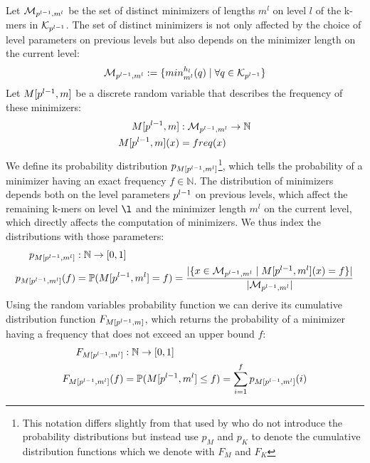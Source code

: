 \documentclass[a4paper,titlepage,onecolumn,oneside,12pt,nenglish,titlepage=firstiscover]{scrbook}
\theoremstyle{plain} %
\theoremstyle{definition} %
\theoremstyle{remark} %
\theoremstyle{plain}
\newcommand{\NN}{\mathbb{N}} %
\newcommand{\minimizerLength}{m}
\newcommand{\level}{l}
\newcommand{\minimizer}{x}
\newcommand{\kmer}{q}
\begin{document}
Let $\distinctMinimizers{\level}$ be the set of distinct minimizers of lengths $\minimizerLength^\level$ on level $\level$ of the k-mers in $\distinctKmers{\level}$. The set of distinct minimizers is not only affected by the choice of level parameters on previous levels but also depends on the minimizer length on the current level:
\begin{equation}
	\distinctMinimizers{\level} := \{\minimizerOf{\kmer}{\level} \mid \forall \kmer \in \distinctKmers{\level}\}
\end{equation}
Let $\manualZV{M}{\levelParameters{\level-1}}{m}$ be a discrete random variable that describes the frequency of these minimizers:
\begin{align}
	\manualZV{M}{\levelParameters{\level-1}}{m} &: \distinctMinimizers{\level} \rightarrow \NN
	\\
	\manualZV{M}{\levelParameters{\level-1}}{m}(\minimizer) &= \frequencyOf{\minimizer}
\end{align}
We define its probability distribution $\probabilityDistribution{\manualZV{M}{\levelParameters{\level-1}}{\minimizerLength^\level}}$\footnote{This notation differs slightly from that used by \citet{schulte-mattler_rshash_2026} who do not introduce the probability distributions but instead use $p_M$ and $p_K$ to denote the cumulative distribution functions which we denote with $F_M$ and $F_K$}, which tells the probability of a minimizer having an exact frequency $f \in \NN$. The distribution of minimizers depends both on the level parameters $\levelParameters{\level-1}$ on previous levels, which affect the remaining k-mers on level $\l$ and the minimizer length $\minimizerLength^\level$ on the current level, which directly affects the computation of minimizers. We thus index the distributions with those parameters:
\begin{align}
	\probabilityDistribution{\manualZV{M}{\levelParameters{\level-1}}{\minimizerLength^\level}} &: \NN \rightarrow [0,1]
	\\
	\probabilityDistribution{\manualZV{M}{\levelParameters{\level-1}}{\minimizerLength^\level}}(f) &= \mathbb{P}(\manualZV{M}{\levelParameters{\level-1}}{\minimizerLength^\level} = f) = \frac{|\{\minimizer \in \distinctMinimizers{\level} \mid 
		\manualZV{M}{\levelParameters{\level-1}}{\minimizerLength^\level}(\minimizer)=f \}|}{|\distinctMinimizers{\level}|}
\end{align}
Using the random variables probability function we can derive its cumulative distribution function $\CDF{\manualZV{M}{\levelParameters{\level-1}}{m}}$, which returns the probability of a minimizer having a frequency that does not exceed an upper bound $f$: 
\begin{align}
	\CDF{\manualZV{M}{\levelParameters{\level-1}}{\minimizerLength^\level}} &: \NN \rightarrow [0,1]\\
	\CDF{\manualZV{M}{\levelParameters{\level-1}}{\minimizerLength^\level}}(f) &= \mathbb{P}(\manualZV{M}{\levelParameters{\level-1}}{\minimizerLength^\level} \leq f) = \sum_{i=1}^f \probabilityDistribution{\manualZV{M}{\levelParameters{\level-1}}{\minimizerLength^\level}}(i)
\end{align}
\end{document}

